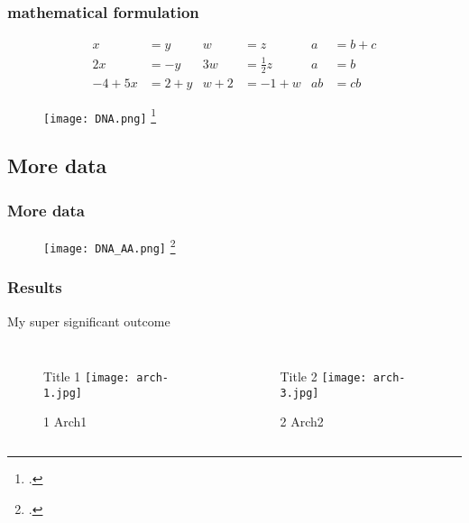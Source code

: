 \documentclass{beamer}
\begin{document}
  \begin{frame}
    \frametitle{mathematical formulation}
    \begin{align*}
      x&=y           &  w &=z              &  a&=b+c\\
      2x&=-y         &  3w&=\frac{1}{2}z   &  a&=b\\
      -4 + 5x&=2+y   &  w+2&=-1+w          &  ab&=cb
    \end{align*}
  \end{frame}


  \begin{frame}
    \begin{figure}[h]
      \centering
      \texttt{[image: DNA.png]}
      \footcite{WATSON_1953}
    \end{figure}

  \end{frame}




\subsection{More data}

  \begin{frame}
    \frametitle{More data}
    \pause
    \begin{figure}[h]
      \centering
      \texttt{[image: DNA\_AA.png]}
      \footcite{Li_2011}
    \end{figure}
  \end{frame}

  \begin{frame}
    \frametitle{Results}
    My super significant outcome
    \begin{columns}

      \pause
      \begin{figure}[h]
        \centering
        Title 1
        \texttt{[image: arch-1.jpg]}
        \caption{1 Arch1}
        \label{fig:1}
      \end{figure} \pause


      \begin{figure}[h]
        \centering
        Title 2
        \texttt{[image: arch-3.jpg]}
        \caption{2 Arch2}
        \label{fig:2}
      \end{figure}

    \end{columns}

  \end{frame}
\end{document}
